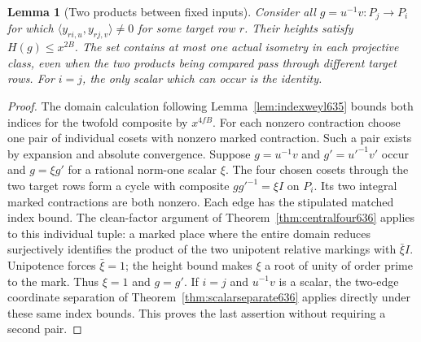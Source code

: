 \documentclass[a4paper,11pt]{article}
\newtheorem{lemma}[proposition]{Lemma}
\theoremstyle{definition}
\theoremstyle{remark}
\numberwithin{equation}{section}
\begin{document}
\begin{lemma}[Two products between fixed inputs]
\leavevmode\label{lem:uniqueproduct637}
Consider all \(g=u^{-1}v:P_j\to P_i\) for which
\(\langle y_{ri,u},y_{rj,v}\rangle\ne0\) for some target row \(r\).
Their heights satisfy \(H(g)\le x^{2B}\).
The set contains at most one actual isometry in each projective
class, even when the two products being compared pass through
different target rows. For \(i=j\), the only scalar which can
occur is the identity.
\end{lemma}
\begin{proof}
The domain calculation following Lemma~\ref{lem:indexweyl635}
bounds both indices for the twofold composite by \(x^{4fB}\).
For each nonzero contraction choose one pair of individual cosets
with nonzero marked contraction. Such a pair exists by expansion and
absolute convergence. Suppose \(g=u^{-1}v\) and \(g'={u'}^{-1}v'\)
occur and \(g=\xi g'\) for a rational norm-one scalar \(\xi\).
The four chosen cosets through the two target rows form a cycle
with composite \(g{g'}^{-1}=\xi I\) on \(P_i\). Its two integral
marked contractions are both nonzero. Each edge has the stipulated
matched index bound. The clean-factor argument of
Theorem~\ref{thm:centralfour636} applies to this individual tuple:
a marked place where the entire domain reduces surjectively
identifies the product of the two unipotent relative markings with
\(\bar\xi I\). Unipotence forces \(\bar\xi=1\); the height bound
makes \(\xi\) a root of unity of order prime to the mark. Thus
\(\xi=1\) and \(g=g'\). If \(i=j\) and \(u^{-1}v\) is a scalar,
the two-edge coordinate separation of
Theorem~\ref{thm:scalarseparate636} applies directly under these
same index bounds. This proves the last assertion without
requiring a second pair.
\end{proof}
\end{document}
